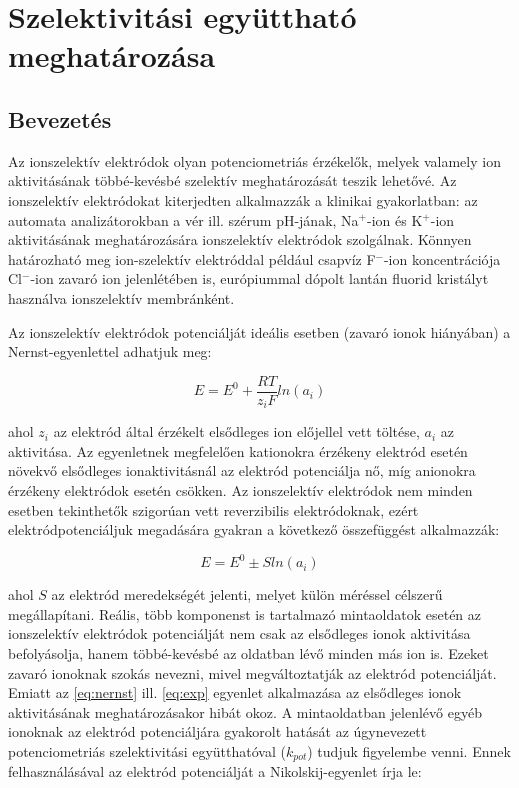 \fancyhead[LO,RE]{\thesection}
\fancyfoot[LE,RO]{\thepage}

\setcounter{section}{5}
\section{Szelektivitási együttható meghatározása}
\subsection{Bevezetés}

Az ionszelektív elektródok olyan potenciometriás érzékelők, melyek valamely ion aktivitásának többé-kevésbé szelektív meghatározását teszik lehetővé.
Az ionszelektív elektródokat kiterjedten alkalmazzák a klinikai gyakorlatban: az automata analizátorokban a vér ill. szérum pH-jának, Na$^+$-ion és K$^+$-ion aktivitásának meghatározására ionszelektív elektródok szolgálnak. Könnyen határozható meg ion-szelektív elektróddal például csapvíz F$^-$-ion koncentrációja Cl$^-$-ion zavaró ion jelenlétében is, európiummal dópolt lantán fluorid kristályt használva ionszelektív membránként.

Az ionszelektív elektródok potenciálját ideális esetben (zavaró ionok hiányában) a Nernst-egyenlettel adhatjuk meg:

\begin{equation}
\label{eq:nernst}
	E
	=
	E^0
	+\frac{RT}{z_i F}
	ln(a_i)
\end{equation}

ahol $z_i$ az elektród által érzékelt elsődleges ion előjellel vett töltése, $a_i$ az aktivitása.
Az egyenletnek megfelelően kationokra érzékeny elektród esetén növekvő elsődleges ionaktivitásnál az elektród potenciálja nő, míg anionokra érzékeny elektródok esetén csökken.
Az ionszelektív elektródok nem minden esetben tekinthetők szigorúan vett reverzibilis elektródoknak, ezért elektródpotenciáljuk megadására gyakran a következő összefüggést alkalmazzák:

\begin{equation}
\label{eq:exp}
	E
	=
	E^0
	\pm S ln(a_i)
\end{equation}

ahol $S$ az elektród meredekségét jelenti, melyet külön méréssel célszerű megállapítani.
Reális, több komponenst is tartalmazó mintaoldatok esetén az ionszelektív elektródok potenciálját nem csak az elsődleges ionok aktivitása befolyásolja, hanem többé-kevésbé az oldatban lévő minden más ion is.
Ezeket zavaró ionoknak szokás nevezni, mivel megváltoztatják az elektród potenciálját.
Emiatt az \ref{eq:nernst} ill. \ref{eq:exp} egyenlet alkalmazása az elsődleges ionok aktivitásának meghatározásakor hibát okoz.
A mintaoldatban jelenlévő egyéb ionoknak az elektród potenciáljára gyakorolt hatását az úgynevezett potenciometriás szelektivitási együtthatóval ($k_{pot}$) tudjuk figyelembe venni.
Ennek felhasználásával az elektród potenciálját a Nikolskij-egyenlet írja le:

